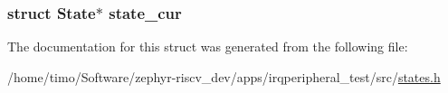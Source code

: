 \subsubsection[{\texorpdfstring{state\+\_\+cur}{state_cur}}]{\setlength{\rightskip}{0pt plus 5cm}struct {\bf State}$\ast$ state\+\_\+cur}\hypertarget{struct_action_arg_a2f7d37145be4a5d1c22f700f31ae2c27}{}\label{struct_action_arg_a2f7d37145be4a5d1c22f700f31ae2c27}


The documentation for this struct was generated from the following file\+:\begin{DoxyCompactItemize}
\item 
/home/timo/\+Software/zephyr-\/riscv\+\_\+dev/apps/irqperipheral\+\_\+test/src/\hyperlink{states_8h}{states.\+h}\end{DoxyCompactItemize}
